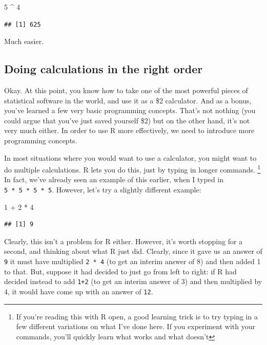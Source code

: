 \documentclass[
]{book}
\newenvironment{Shaded}{\begin{snugshade}}{\end{snugshade}}
\newcommand{\DecValTok}[1]{\textcolor[rgb]{0.00,0.00,0.81}{#1}}
\newcommand{\SpecialCharTok}[1]{\textcolor[rgb]{0.00,0.00,0.00}{#1}}
\begin{document}
\begin{Shaded}
\begin{Highlighting}[]
\DecValTok{5} \SpecialCharTok{\^{}} \DecValTok{4}
\end{Highlighting}
\end{Shaded}

\begin{verbatim}
## [1] 625
\end{verbatim}

Much easier.

\hypertarget{bedmas}{%
\subsection{Doing calculations in the right order}\label{bedmas}}

Okay. At this point, you know how to take one of the most powerful pieces of statistical software in the world, and use it as a \$2 calculator. And as a bonus, you've learned a few very basic programming concepts. That's not nothing (you could argue that you've just saved yourself \$2) but on the other hand, it's not very much either. In order to use R more effectively, we need to introduce more programming concepts.

In most situations where you would want to use a calculator, you might want to do multiple calculations. R lets you do this, just by typing in longer commands. \footnote{If you're reading this with R open, a good learning trick is to try typing in a few different variations on what I've done here. If you experiment with your commands, you'll quickly learn what works and what doesn't} In fact, we've already seen an example of this earlier, when I typed in \texttt{5\ *\ 5\ *\ 5\ *\ 5}. However, let's try a slightly different example:

\begin{Shaded}
\begin{Highlighting}[]
\DecValTok{1} \SpecialCharTok{+} \DecValTok{2} \SpecialCharTok{*} \DecValTok{4}
\end{Highlighting}
\end{Shaded}

\begin{verbatim}
## [1] 9
\end{verbatim}

Clearly, this isn't a problem for R either. However, it's worth stopping for a second, and thinking about what R just did. Clearly, since it gave us an answer of \texttt{9} it must have multiplied \texttt{2\ *\ 4} (to get an interim answer of 8) and then added 1 to that. But, suppose it had decided to just go from left to right: if R had decided instead to add \texttt{1+2} (to get an interim answer of 3) and then multiplied by 4, it would have come up with an answer of \texttt{12}.
\end{document}
